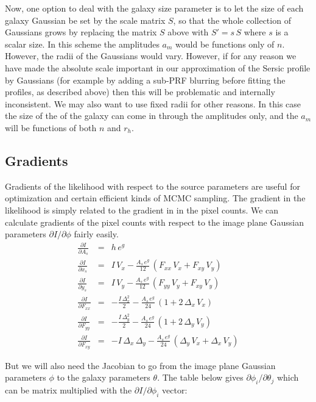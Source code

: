 \documentclass[modern]{aastex6}
\newcommand{\dx}{\Delta_x}
\newcommand{\dy}{\Delta_y}
\begin{document}
Now, one option to deal with the galaxy size parameter is to let the size of each galaxy Gaussian be set by the scale matrix $S$, so that the whole collection of Gaussians grows by replacing the matrix $S$ above with $S'=s\,S$ where $s$ is a scalar size.
In this scheme the amplitudes $a_m$ would be functions only of $n$.
However, the radii of the Gaussians would vary.
However, if for any reason we have made the absolute scale important in our approximation of the Sersic profile by Gaussians (for example by adding a sub-PRF blurring before fitting the profiles, as described above) then this will be problematic and internally inconsistent.
We may also want to use fixed radii for other reasons.
In this case the size of the of the galaxy can come in through the amplitudes only, and the $a_m$ will be functions of both $n$ and $r_h$.


\subsection{Gradients}
Gradients of the likelihood with respect to the source parameters are useful for optimization and certain efficient kinds of MCMC sampling.
The gradient in the likelihood is simply related to the gradient in in the pixel counts.
We can calculate gradients of the pixel counts with respect to the  image plane Gaussian parameters $\partial I/\partial \phi$ fairly easily.
\begin{eqnarray}
\frac{\partial I}{\partial A_s} & = & h \, e^g \\
\frac{\partial I}{\partial x_s} & = & I \, V_x - \frac{A_s \, e^g}{12} \, (F_{xx} \, V_x + F_{xy} \, V_y) \\
\frac{\partial I}{\partial y_s} & = & I \, V_y - \frac{A_s \, e^g}{12} \,  (F_{yy} \, V_y + F_{xy} \, V_y) \\
\frac{\partial I}{\partial F_{xx}} & = & - \frac{I \, \dx^2}{2} - \frac{A_s \, e^g}{24} \,  (1 + 2\, \dx \, V_x) \\
\frac{\partial I}{\partial F_{yy}} & = & - \frac{I \, \dy^2}{2} - \frac{A_s \, e^g}{24} \,  (1 + 2\, \dy \, V_y) \\
\frac{\partial I}{\partial F_{xy}} & = & - {I \, \dx\, \dy} - \frac{A_s \, e^g}{24} \,  (\dy \, V_x + \dx \, V_y)
\end{eqnarray}

But we will also need the Jacobian to go from the image plane Gaussian parameters $\phi$ to the galaxy parameters $\theta$.
The table below gives $\partial \phi_i / \partial \theta_j$ which can be matrix multiplied with the $\partial I / \partial \phi_i$ vector:
\end{document}
